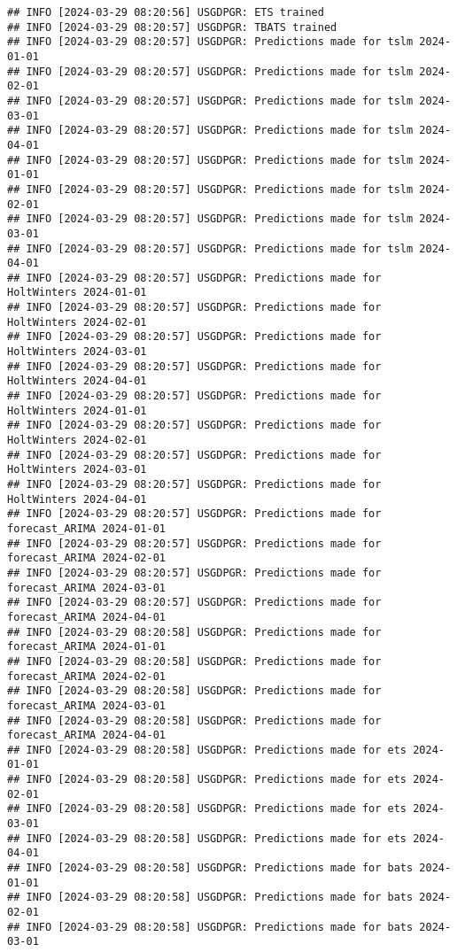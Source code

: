 \documentclass[
]{article}
\begin{document}
\begin{verbatim}
## INFO [2024-03-29 08:20:56] USGDPGR: ETS trained
## INFO [2024-03-29 08:20:57] USGDPGR: TBATS trained
## INFO [2024-03-29 08:20:57] USGDPGR: Predictions made for tslm 2024-01-01
## INFO [2024-03-29 08:20:57] USGDPGR: Predictions made for tslm 2024-02-01
## INFO [2024-03-29 08:20:57] USGDPGR: Predictions made for tslm 2024-03-01
## INFO [2024-03-29 08:20:57] USGDPGR: Predictions made for tslm 2024-04-01
## INFO [2024-03-29 08:20:57] USGDPGR: Predictions made for tslm 2024-01-01
## INFO [2024-03-29 08:20:57] USGDPGR: Predictions made for tslm 2024-02-01
## INFO [2024-03-29 08:20:57] USGDPGR: Predictions made for tslm 2024-03-01
## INFO [2024-03-29 08:20:57] USGDPGR: Predictions made for tslm 2024-04-01
## INFO [2024-03-29 08:20:57] USGDPGR: Predictions made for HoltWinters 2024-01-01
## INFO [2024-03-29 08:20:57] USGDPGR: Predictions made for HoltWinters 2024-02-01
## INFO [2024-03-29 08:20:57] USGDPGR: Predictions made for HoltWinters 2024-03-01
## INFO [2024-03-29 08:20:57] USGDPGR: Predictions made for HoltWinters 2024-04-01
## INFO [2024-03-29 08:20:57] USGDPGR: Predictions made for HoltWinters 2024-01-01
## INFO [2024-03-29 08:20:57] USGDPGR: Predictions made for HoltWinters 2024-02-01
## INFO [2024-03-29 08:20:57] USGDPGR: Predictions made for HoltWinters 2024-03-01
## INFO [2024-03-29 08:20:57] USGDPGR: Predictions made for HoltWinters 2024-04-01
## INFO [2024-03-29 08:20:57] USGDPGR: Predictions made for forecast_ARIMA 2024-01-01
## INFO [2024-03-29 08:20:57] USGDPGR: Predictions made for forecast_ARIMA 2024-02-01
## INFO [2024-03-29 08:20:57] USGDPGR: Predictions made for forecast_ARIMA 2024-03-01
## INFO [2024-03-29 08:20:57] USGDPGR: Predictions made for forecast_ARIMA 2024-04-01
## INFO [2024-03-29 08:20:58] USGDPGR: Predictions made for forecast_ARIMA 2024-01-01
## INFO [2024-03-29 08:20:58] USGDPGR: Predictions made for forecast_ARIMA 2024-02-01
## INFO [2024-03-29 08:20:58] USGDPGR: Predictions made for forecast_ARIMA 2024-03-01
## INFO [2024-03-29 08:20:58] USGDPGR: Predictions made for forecast_ARIMA 2024-04-01
## INFO [2024-03-29 08:20:58] USGDPGR: Predictions made for ets 2024-01-01
## INFO [2024-03-29 08:20:58] USGDPGR: Predictions made for ets 2024-02-01
## INFO [2024-03-29 08:20:58] USGDPGR: Predictions made for ets 2024-03-01
## INFO [2024-03-29 08:20:58] USGDPGR: Predictions made for ets 2024-04-01
## INFO [2024-03-29 08:20:58] USGDPGR: Predictions made for bats 2024-01-01
## INFO [2024-03-29 08:20:58] USGDPGR: Predictions made for bats 2024-02-01
## INFO [2024-03-29 08:20:58] USGDPGR: Predictions made for bats 2024-03-01

\end{verbatim}
\end{document}
